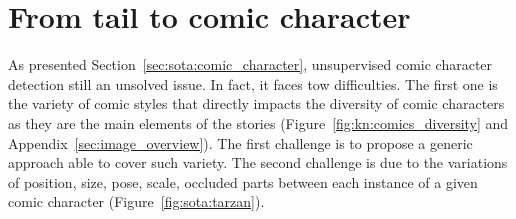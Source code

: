 



\section{From tail to comic character} %
\label{sec:se:tail_to_character}



As presented Section~\ref{sec:sota:comic_character}, unsupervised comic character detection still an unsolved issue.
In fact, it faces tow difficulties.
The first one is the variety of comic styles that directly impacts the diversity of comic characters as they are the main elements of the stories (Figure~\ref{fig:kn:comics_diversity} and Appendix~\ref{sec:image_overview}).
The first challenge is to propose a generic approach able to cover such variety.
The second challenge is due to the variations of position, size, pose, scale, occluded parts between each instance of a given comic character (Figure~\ref{fig:sota:tarzan}).

